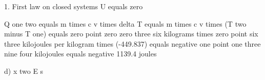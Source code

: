 1. First law on closed systems  
U equals zero  

Q one two equals m times c v times delta T  
equals m times c v times (T two minus T one)  
equals zero point zero zero three six kilograms times zero point six three kilojoules per kilogram times (-449.837)  
equals negative one point one three nine four kilojoules equals negative 1139.4 joules  

d) x two E s
